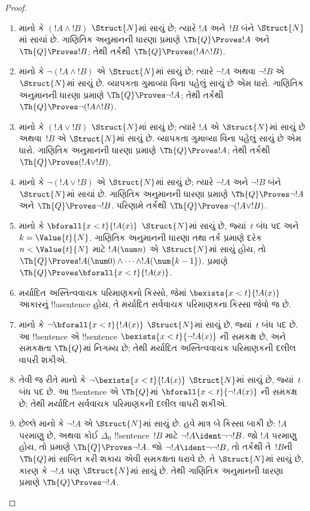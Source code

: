 \documentclass[../../../include/open-logic-section]{subfiles}
\begin{document}
\begin{proof}
\begin{enumerate}
\item માનો કે $(!A \land !B)$
$\Struct{N}$માં સાચું છે;
ત્યારે $!A$ અને~$!B$ બંને
$\Struct{N}$માં સાચાં છે.
ગાણિતિક અનુમાનની ધારણા પ્રમાણે
$\Th{Q} \Proves !A$ અને
$\Th{Q} \Proves !B$;
તેથી તર્કથી
$\Th{Q} \Proves (!A \land !B)$.
%
\item માનો કે
$\lnot (!A \land !B)$ એ
$\Struct{N}$માં સાચું છે;
ત્યારે $\lnot !A$ અથવા
$\lnot !B$ એ $\Struct{N}$માં
સાચું છે. વ્યાપકતા ગુમાવ્યા
વિના પહેલું સાચું છે એમ
ધારો. ગાણિતિક અનુમાનની ધારણા પ્રમાણે
$\Th{Q} \Proves \lnot !A$;
તેથી તર્કથી $\Th{Q} \Proves
\lnot (!A \land !B)$.
%
\item માનો કે $(!A \lor !B)$
$\Struct{N}$માં સાચું છે;
ત્યારે $!A$ એ $\Struct{N}$માં
સાચું છે અથવા~$!B$ એ
$\Struct{N}$માં સાચું છે.
વ્યાપકતા ગુમાવ્યા વિના પહેલું
સાચું છે એમ ધારો.
ગાણિતિક અનુમાનની ધારણા પ્રમાણે
$\Th{Q} \Proves !A$;
તેથી તર્કથી $\Th{Q} \Proves
(!A \lor !B)$.
%
\item માનો કે
$\lnot(!A \lor !B)$ એ
$\Struct{N}$માં સાચું છે;
ત્યારે $\lnot !A$ અને
$\lnot !B$ બંને $\Struct{N}$માં
સાચાં છે. ગાણિતિક અનુમાનની ધારણા
પ્રમાણે $\Th{Q} \Proves
\lnot !A$ અને
$\Th{Q} \Proves \lnot !B$.
પરિણામે તર્કથી
$\Th{Q} \Proves
\lnot(!A \lor !B)$.
%
\item માનો કે
$\bforall{x<t}{!A(x)}$
$\Struct{N}$માં સાચું છે,
જ્યાં~$t$ બંધ પદ અને
$k=\Value{t}{N}$. ગાણિતિક અનુમાનની
ધારણા તથા તર્ક પ્રમાણે
દરેક $n < \Value{t}{N}$
માટે $!A(\num n)$ એ
$\Struct{N}$માં સાચું હોય,
તો $\Th{Q} \Proves
!A(\num 0) \land \dots \land !A(\num{k-1})$.
પ્રમાણે $\Th{Q} \Proves
\bforall{x<t}{!A(x)}$.
%
\item મર્યાદિત અસ્તિત્વવાચક
પરિમાણકનો કિસ્સો, જેમાં
$\bexists{x < t}{!A(x)}$
આકારનું !!a{sentence} હોય,
તે મર્યાદિત સર્વવાચક
પરિમાણકના કિસ્સા જેવો જ છે.
%
\item માનો કે
$\lnot \bforall{x<t}{!A(x)}$
$\Struct{N}$માં સાચું છે,
જ્યાં~$t$ બંધ પદ છે.
આ !!{sentence} એ
!!{sentence}
$\bexists{x<t}{\lnot !A(x)}$
ની સમકક્ષ છે, અને સમકક્ષતા
$\Th{Q}$માં નિગમ્ય છે;
તેથી મર્યાદિત અસ્તિત્વવાચક
પરિમાણકની દલીલ વાપરી શકીએ.
%
\item તેવી જ રીતે માનો કે
$\lnot \bexists{x<t}{!A(x)}$
$\Struct{N}$માં સાચું છે,
જ્યાં~$t$ બંધ પદ છે.
આ !!{sentence} એ
$\Th{Q}$માં
$\bforall{x<t}{\lnot!A(x)}$
ની સમકક્ષ છે; તેથી
મર્યાદિત સર્વવાચક પરિમાણકની
દલીલ વાપરી શકીએ.
%
\item છેલ્લે માનો કે
$\lnot !A$ એ $\Struct{N}$માં
સાચું છે. હવે માત્ર બે
કિસ્સા બાકી છે: $!A$
પરમાણુ છે, અથવા કોઈ
$\Delta_0$ !!{sentence}~$!B$
માટે
$\lnot !A \ident \lnot\lnot !B$.
જો $!A$ પરમાણુ હોય, તો
પ્રમાણે $\Th{Q} \Proves
\lnot !A$. જો
$\lnot !A \ident \lnot\lnot !B$,
તો તર્કથી તે~$!B$ની
$\Th{Q}$માં સાબિત કરી શકાય
એવી સમકક્ષતા ધરાવે છે.
તે $\Struct{N}$માં સાચું છે,
કારણ કે $\lnot !A$ પણ
$\Struct{N}$માં સાચું છે.
તેથી ગાણિતિક અનુમાનની ધારણા પ્રમાણે
$\Th{Q} \Proves \lnot !A$.
\end{enumerate}
\end{proof}
\end{document}
